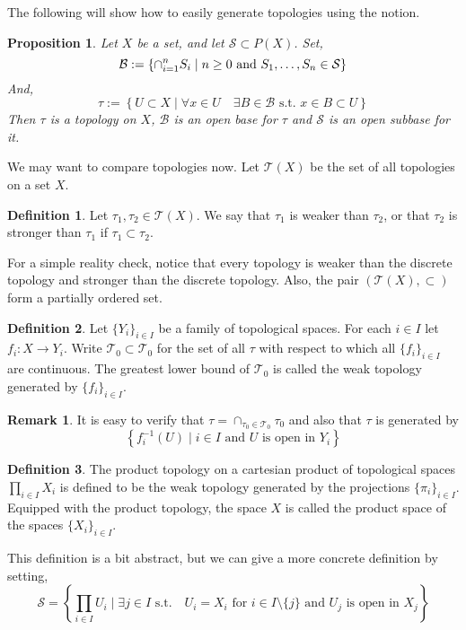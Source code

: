 \documentclass[11pt,a4paper]{article}
\theoremstyle{definition}
\newtheorem{definition}{Definition}[section]
\newtheorem{remark}{Remark}[section]
\theoremstyle{plain}
\newtheorem{proposition}[theorem]{Proposition}
\newcommand{\st}{\text{ s.t. }}
\newcommand{\set}[2]{ \left\{ #1 \mid #2 \right\} }
\begin{document}
	The following will show how to easily generate topologies using the notion.
	\begin{proposition}
		Let $X$ be a set, and let $\mathcal{S} \subset P(X)$. Set,
		\[
			\mathcal{B} := \set{\cap_{i=1}^{n}{S_i}}{n \geq 0 \textnormal{ and }
			S_1,\dots,S_n \in \mathcal{S}}
		\]
		And,
		\[
			\tau := \set{U \subset X}{\forall x \in U \quad \exists B \in 
			\mathcal{B} \st x \in B \subset U}
		\]
		Then $\tau$ is a topology on $X$, $\mathcal{B}$ is an open base for 
		$\tau$ and $\mathcal{S}$ is an open subbase for it.
	\end{proposition}
	We may want to compare topologies now. Let $\mathcal{T}(X)$ be the set of
	all topologies on a set $X$.
	\begin{definition}
		Let $\tau_1,\tau_2 \in \mathcal{T}(X)$. We say that $\tau_1$ is weaker
		than $\tau_2$, or that $\tau_2$ is stronger than $\tau_1$ if 
		$\tau_1 \subset \tau_2$.
	\end{definition}
	For a simple reality check, notice that every topology is weaker than the
	discrete topology and stronger than the discrete topology. Also, the
	pair $(\mathcal{T}(X), \subset)$ form a partially ordered set.
	\begin{definition}
		Let $\{Y_i\}_{i \in I}$ be a family of topological spaces. For each
		$i \in I$ let $f_i \colon X \to Y_i$. Write $\mathcal{T}_0 \subset 
		\mathcal{T}_0$ for the set of all $\tau$ with respect to which all
		$\{f_i\}_{i \in I}$ are continuous. The greatest lower bound of 
		$\mathcal{T}_0$ is called the weak topology generated by 
		$\{f_i\}_{i \in I}$.
	\end{definition}
	\begin{remark}
	It is easy to verify that $\tau = \cap_{\tau_0 \in \mathcal{T}_0}{\tau_0}$
	and also that $\tau$ is generated by 
	\[
		\set{f_i^{-1}(U)}{i \in I \text{ and $U$ is open in $Y_i$}}
	\]
	\end{remark}
	\begin{definition}
		The product topology on a cartesian product of topological spaces
		$\prod_{i \in I} X_i$ is defined to be the weak topology generated by
		the projections $\{\pi_i\}_{i \in I}$. Equipped with the product
		topology, the space $X$ is called the product space of the spaces
		$\{X_i\}_{i \in I}$.
	\end{definition}
	This definition is a bit abstract, but we can give a more concrete 
	definition by setting,
	\[
		\mathcal{S} = \set{\prod_{i \in I}{U_i}}{\exists j \in I \st 
		\text{ $U_i = X_i$ for $i \in I \setminus \{j\}$ and $U_j$ is open in
		$X_j$}}
	\]
\end{document}
